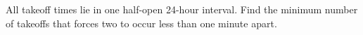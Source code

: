 All takeoff times lie in one half-open 24-hour interval. Find the minimum number of takeoffs that forces two to occur less than one minute apart.
